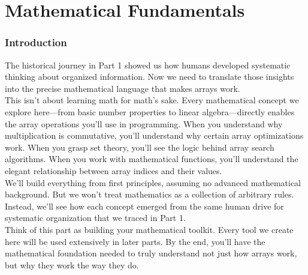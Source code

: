 
\part{Mathematical Fundamentals}
\section*{Introduction}

The historical journey in Part 1 showed us how humans developed systematic thinking about organized information. Now we need to translate those insights into the precise mathematical language that makes arrays work.\\
This isn't about learning math for math's sake. Every mathematical concept we explore here—from basic number properties to linear algebra—directly enables the array operations you'll use in programming. When you understand why multiplication is commutative, you'll understand why certain array optimizations work. When you grasp set theory, you'll see the logic behind array search algorithms. When you work with mathematical functions, you'll understand the elegant relationship between array indices and their values.\\
We'll build everything from first principles, assuming no advanced mathematical background. But we won't treat mathematics as a collection of arbitrary rules. Instead, we'll see how each concept emerged from the same human drive for systematic organization that we traced in Part 1.\\
Think of this part as building your mathematical toolkit. Every tool we create here will be used extensively in later parts. By the end, you'll have the mathematical foundation needed to truly understand not just how arrays work, but why they work the way they do.